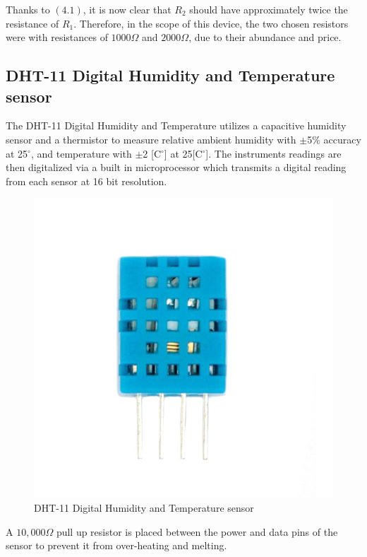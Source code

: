 \documentclass[twoside]{ctuthesis}
\theoremstyle{plain}
\theoremstyle{definition}
\theoremstyle{note}
\begin{document}
Thanks to $(4.1)$, it is now clear that $R_2$ should have approximately twice the resistance of $R_1$. Therefore, in the scope of this device, the two chosen resistors were with resistances of $1000\Omega$ and $2000\Omega$, due to their abundance and price.


\subsection{DHT-11 Digital Humidity and Temperature sensor}
The DHT-11 Digital Humidity and Temperature utilizes a capacitive humidity sensor and a thermistor to measure relative ambient humidity with $\pm$5$\%$ accuracy at 25$^\circ$, and temperature with $\pm$2 [C$^\circ$] at 25[C$^\circ$]. The instruments readings are then digitalized via a built in microprocessor which transmits a digital reading from each sensor at 16 bit resolution.

\begin{figure}[H]
	\centering
	\includegraphics[scale=0.5]{DHT11}
	\caption{DHT-11 Digital Humidity and Temperature sensor\cite{HC-SR04}}
\end{figure}

A $10,000\Omega$ pull up resistor is placed between the power and data pins of the sensor to prevent it from over-heating and melting.
\end{document}
